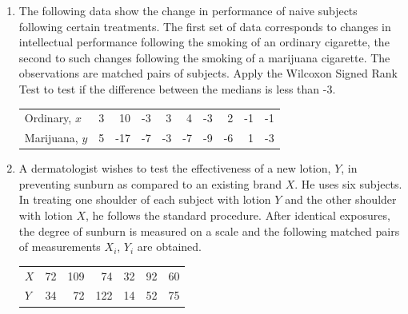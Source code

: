 \documentclass{article}
\begin{document}
\begin{enumerate}
    \item The following data show the change in performance of naive subjects following certain treatments. The first set of data corresponds to changes in intellectual performance following the smoking of an ordinary cigarette, the second to such changes following the smoking of a marijuana cigarette. The observations are matched pairs of subjects. Apply the Wilcoxon Signed Rank Test to test if the difference between the medians is less than -3.
    \begin{table}[H]
    \begin{tabular}{lrrrrrrrrr}
    Ordinary, $x$ & 3 & 10 & -3 & 3 & 4 & -3 & 2 & -1 & -1 \\
    Marijuana, $y$ & 5 & -17 & -7 & -3 & -7 & -9 & -6 & 1 & -3
    \end{tabular}
    \end{table}

    \item A dermatologist wishes to test the effectiveness of a new lotion, $Y$, in preventing sunburn as compared to an existing brand $X$. He uses six subjects. In treating one shoulder of each subject with lotion $Y$ and the other shoulder with lotion $X$, he follows the standard procedure. After identical exposures, the degree of sunburn is measured on a scale and the following matched pairs of measurements $X_i$, $Y_i$ are obtained.
    \begin{table}[H]
    \begin{tabular}{lrrrrrr}
    $X$ & 72 & 109 & 74 & 32 & 92 & 60 \\
    $Y$ & 34 & 72 & 122 & 14 & 52 & 75
    \end{tabular}
    \end{table}


\end{enumerate}
\end{document}
